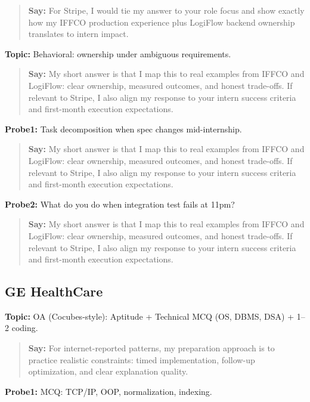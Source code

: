 \documentclass[9pt,a4paper]{article}
\begin{document}
\begin{quote}\small\textbf{Say:} For Stripe, I would tie my answer to your role focus and show exactly how my IFFCO production experience plus LogiFlow backend ownership translates to intern impact.\end{quote}
\vspace{2mm}
\textbf{Topic:} Behavioral: ownership under ambiguous requirements.

\begin{quote}\small\textbf{Say:} My short answer is that I map this to real examples from IFFCO and LogiFlow: clear ownership, measured outcomes, and honest trade-offs. If relevant to Stripe, I also align my response to your intern success criteria and first-month execution expectations.\end{quote}
\vspace{2mm}
\textbf{Probe1:} Task decomposition when spec changes mid-internship.

\begin{quote}\small\textbf{Say:} My short answer is that I map this to real examples from IFFCO and LogiFlow: clear ownership, measured outcomes, and honest trade-offs. If relevant to Stripe, I also align my response to your intern success criteria and first-month execution expectations.\end{quote}
\vspace{2mm}
\textbf{Probe2:} What do you do when integration test fails at 11pm?

\begin{quote}\small\textbf{Say:} My short answer is that I map this to real examples from IFFCO and LogiFlow: clear ownership, measured outcomes, and honest trade-offs. If relevant to Stripe, I also align my response to your intern success criteria and first-month execution expectations.\end{quote}
\vspace{2mm}
\subsection{GE HealthCare}
\textbf{Topic:} OA (Cocubes-style): Aptitude + Technical MCQ (OS, DBMS, DSA) + 1--2 coding.

\begin{quote}\small\textbf{Say:} For internet-reported patterns, my preparation approach is to practice realistic constraints: timed implementation, follow-up optimization, and clear explanation quality.\end{quote}
\vspace{2mm}
\textbf{Probe1:} MCQ: TCP/IP, OOP, normalization, indexing.
\end{document}
